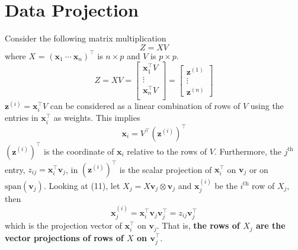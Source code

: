 \section{Data Projection}
Consider the following matrix multiplication
\begin{equation*}
    Z = XV
\end{equation*}
where $X$ = $(\mathbf{x}_1\ \cdots\ \mathbf{x}_n)^{\top}$ is $n \times p$ and $V$ is $p \times p$.
\begin{equation}
    Z = XV =\begin{bmatrix}
        \mathbf{x}_1^{\top} V\\
        \vdots\\
        \mathbf{x}_n^{\top} V\\
    \end{bmatrix}  = 
    \begin{bmatrix}
        \mathbf{z}^{(1)}\\
        \vdots\\
        \mathbf{z}^{(n)}
    \end{bmatrix}
\end{equation}
$\mathbf{z}^{(i)} = \mathbf{x}_{i}^{\top} V$ can be considered as a linear combination of rows of $V$ using the entries in $\mathbf{x}_i^{\top}$ as weights. This implies
\begin{equation*}
    \mathbf{x}_i = V^{\top}(\mathbf{z}^{(i)})^{\top}
\end{equation*}
$(\mathbf{z}^{(i)})^{\top}$ is the coordinate of $\mathbf{x}_i$ relative to the rows of $V$. Furthermore, the $j^{\text{th}}$ entry, $z_{ij} =  \mathbf{x}_i^{\top} \mathbf{v}_j$, in $(\mathbf{z}^{(i)})^{\top}$ is the scalar projection of $\mathbf{x}_i^{\top}$ on $\mathbf{v}_j$ or on $\text{span}(\mathbf{v}_j)$. Looking at (11), let $X_j = X\mathbf{v}_j \otimes \mathbf{v}_j$ and $\mathbf{x}_j^{(i)}$ be the $i^{\text{th}}$ row of $X_j$, then
\begin{equation*}
    \mathbf{x}_j^{(i)} = \mathbf{x}_i^\top\mathbf{v}_j\mathbf{v}_j^{\top} = z_{ij}\mathbf{v}_j^{\top}
\end{equation*}
which is the projection vector of $\mathbf{x}_i^{\top}$ on $\mathbf{v}_j$.
That is, \textbf{the rows of $X_j$ are the vector projections of rows of $X$ on $\mathbf{v}_j^{\top}$}.

